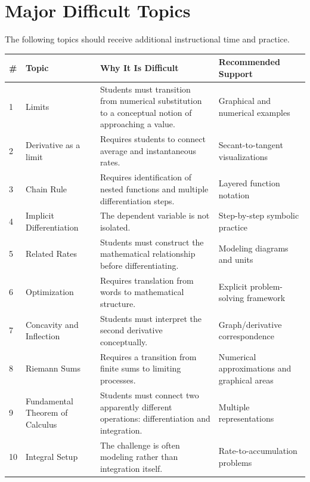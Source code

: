 \documentclass[11pt]{article}
\begin{document}
\section{Major Difficult Topics}

The following topics should receive additional instructional time and
practice.

\begin{longtable}{p{0.7cm}p{4.0cm}p{6.5cm}p{3.0cm}}
\toprule
\textbf{\#} & \textbf{Topic} & \textbf{Why It Is Difficult}
& \textbf{Recommended Support} \\
\midrule

1 & Limits
& Students must transition from numerical substitution to a conceptual
notion of approaching a value.
& Graphical and numerical examples \\

2 & Derivative as a limit
& Requires students to connect average and instantaneous rates.
& Secant-to-tangent visualizations \\

3 & Chain Rule
& Requires identification of nested functions and multiple differentiation
steps.
& Layered function notation \\

4 & Implicit Differentiation
& The dependent variable is not isolated.
& Step-by-step symbolic practice \\

5 & Related Rates
& Students must construct the mathematical relationship before differentiating.
& Modeling diagrams and units \\

6 & Optimization
& Requires translation from words to mathematical structure.
& Explicit problem-solving framework \\

7 & Concavity and Inflection
& Students must interpret the second derivative conceptually.
& Graph/derivative correspondence \\

8 & Riemann Sums
& Requires a transition from finite sums to limiting processes.
& Numerical approximations and graphical areas \\

9 & Fundamental Theorem of Calculus
& Students must connect two apparently different operations:
differentiation and integration.
& Multiple representations \\

10 & Integral Setup
& The challenge is often modeling rather than integration itself.
& Rate-to-accumulation problems \\

\bottomrule
\end{longtable}
\end{document}
